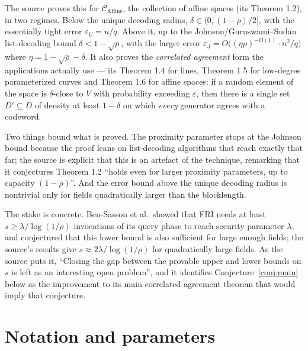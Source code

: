 \documentclass{conjura-conjecture}
\newcommand{\eps}{\varepsilon}
\newcommand{\Caff}{\mathcal{C}_{\mathrm{Affine}}}
\begin{document}
The source proves this for $\Caff$, the collection of affine spaces
(its Theorem 1.2), in two regimes. Below the unique decoding radius,
$\delta \in (0, (1-\rho)/2]$, with the essentially tight error $\eps_{U}
= n/q$. Above it, up to the Johnson/Guruswami--Sudan list-decoding bound
$\delta < 1 - \sqrt{\rho}$, with the larger error $\eps_{J} =
O\bigl((\eta\rho)^{-O(1)} \cdot n^{2}/q\bigr)$ where $\eta = 1 -
\sqrt{\rho} - \delta$. It also proves the \emph{correlated agreement}
form the applications actually use --- its Theorem 1.4 for lines,
Theorem 1.5 for low-degree parameterized curves and Theorem 1.6 for
affine spaces: if a random element of the space is $\delta$-close to $V$
with probability exceeding $\eps$, then there is a single set $D'
\subseteq D$ of density at least $1 - \delta$ on which \emph{every}
generator agrees with a codeword.

Two things bound what is proved. The proximity parameter stops at the
Johnson bound because the proof leans on list-decoding algorithms that
reach exactly that far; the source is explicit that this is an artefact
of the technique, remarking that it conjectures Theorem 1.2 ``holds even
for larger proximity parameters, up to capacity $(1-\rho)$''. And the
error bound above the unique decoding radius is nontrivial only for
fields quadratically larger than the blocklength.

The stake is concrete. Ben-Sasson et al.\ showed that FRI needs at least
$s \ge \lambda / \log(1/\rho)$ invocations of its query phase to reach
security parameter $\lambda$, and conjectured that this lower bound is
also sufficient for large enough fields; the source's results give $s
\approx 2\lambda/\log(1/\rho)$ for quadratically large fields. As the
source puts it, ``Closing the gap between the provable upper and lower
bounds on $s$ is left as an interesting open problem'', and it identifies
Conjecture~\ref{conj:main} below as the improvement to its main
correlated-agreement theorem that would imply that conjecture.

\section{Notation and parameters}\label{sec:notation}
\end{document}
